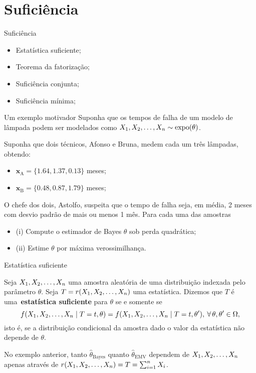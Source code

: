 \section*{Suficiência}
\begin{frame}{Suficiência}
 \begin{itemize}
  \item Estatística suficiente;
  \item Teorema da fatorização;
    \item Suficiência conjunta;
  \item Suficiência mínima;
 \end{itemize}
\end{frame}

\begin{frame}{Um exemplo motivador}
Suponha que os tempos de falha de um modelo de lâmpada podem ser modelados como $X_1, X_2, \ldots, X_n \sim \operatorname{expo}(\theta)$.

Suponha que dois técnicos, Afonso e Bruna, medem cada um três lâmpadas, obtendo:
\begin{itemize}
 \item $\boldsymbol{x}_{\text{A}} = \{1.64, 1.37, 0.13\}$ meses;
 \item $\boldsymbol{x}_{\text{B}} = \{0.48, 0.87, 1.79\}$ meses;
\end{itemize}

O chefe dos dois, Astolfo, suspeita que o tempo de falha seja, em média, 2 meses com desvio padrão de mais ou menos 1 mês.
Para cada uma das amostras
\begin{itemize}
 \item (i) Compute o estimador de Bayes $\theta$ sob perda quadrática; 
 \item (ii) Estime $\theta$ por máxima verossimilhança.
\end{itemize}
\end{frame}

\begin{frame}{Estatística suficiente}
\begin{defn}
 \label{def:sufficient_statistic}
 Seja $X_1, X_2, \ldots, X_n$ uma amostra aleatória de uma distribuição indexada pelo parâmetro $\theta$.
 Seja $T = r(X_1, X_2, \ldots, X_n)$ uma estatística.
 Dizemos que $T$ é uma~\textbf{estatística suficiente} para $\theta$ se e somente se
 \[ f(X_1, X_2, \ldots, X_n \mid T = t, \theta) = f(X_1, X_2, \ldots, X_n \mid T = t, \theta^\prime),\: \forall\, \theta, \theta^\prime \in \Omega, \]
 isto é, se a distribuição condicional da amostra dado o valor da estatística não depende de $\theta$.
\end{defn}

No exemplo anterior, tanto $\hat{\theta}_{\text{Bayes}}$ quanto $\hat{\theta}_{\text{EMV}}$ dependem de $X_1, X_2, \ldots, X_n$ apenas através de $r(X_1, X_2, \ldots, X_n) = T = \sum_{i=1}^n X_i$.
\end{frame}

